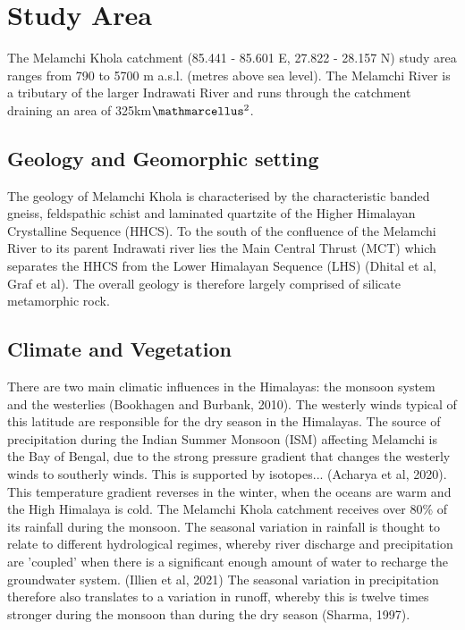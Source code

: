 
\section{Study Area}



The Melamchi Khola catchment (85.441 - 85.601 E, 27.822 - 28.157 N) study area ranges from 790 to 5700 m a.s.l. (metres above sea level). The Melamchi River is a tributary of the larger Indrawati River and runs through the catchment draining an area of 325km$\ttmath{^2}$. 

\subsection{Geology and Geomorphic setting}


The geology of Melamchi Khola is characterised by the characteristic banded gneiss, feldspathic schist and laminated quartzite of the Higher Himalayan Crystalline Sequence (HHCS). To the south of the confluence of the Melamchi River to its parent Indrawati river lies the Main Central Thrust (MCT) which separates the HHCS from the Lower Himalayan Sequence (LHS) (Dhital et al, Graf et al). The overall geology is therefore largely comprised of silicate metamorphic rock.

\bsk
\subsection{Climate and Vegetation}


There are two main climatic influences in the Himalayas: the monsoon system and the westerlies (Bookhagen and Burbank, 2010). The westerly winds typical of this latitude are responsible for the dry season in the Himalayas. The source of precipitation during the Indian Summer Monsoon (ISM) affecting Melamchi is the Bay of Bengal, due to the strong pressure gradient that changes the westerly winds to southerly winds. This is supported by isotopes... (Acharya et al, 2020). This temperature gradient reverses in the winter, when the oceans are warm and the High Himalaya is cold.  The Melamchi Khola catchment receives over 80\% of its rainfall during the monsoon. The seasonal variation in rainfall is thought to relate to different hydrological regimes, whereby river discharge and precipitation are 'coupled' when there is a significant enough amount of water to recharge the groundwater system. (Illien et al, 2021) The seasonal variation in precipitation therefore also translates to a variation in runoff, whereby this is twelve times stronger during the monsoon than during the dry season (Sharma, 1997). 

